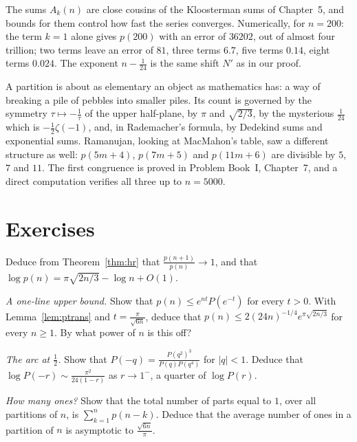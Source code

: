The sums $A_k(n)$ are close cousins of the Kloosterman sums of Chapter~5, and bounds for them control how fast the series converges. Numerically, for $n=200$: the term $k=1$ alone gives $p(200)$ with an error of $36202$, out of almost four trillion; two terms leave an error of $81$, three terms $6.7$, five terms $0.14$, eight terms $0.024$. The exponent $n-\frac1{24}$ is the same shift $N'$ as in our proof.

\begin{beauty}
A partition is about as elementary an object as mathematics has: a way of breaking a pile of pebbles into smaller piles. Its count is governed by the symmetry $\tau\mapsto-\frac1\tau$ of the upper half-plane, by $\pi$ and $\sqrt{2/3}$, by the mysterious $\frac1{24}$ which is $-\frac12\zeta(-1)$, and, in Rademacher's formula, by Dedekind sums and exponential sums. Ramanujan, looking at MacMahon's table, saw a different structure as well: $p(5m+4)$, $p(7m+5)$ and $p(11m+6)$ are divisible by $5$, $7$ and $11$. The first congruence is proved in Problem Book~I, Chapter~7, and a direct computation verifies all three up to $n=5000$.
\end{beauty}

\section{Exercises}

\begin{exercise}[$\star$]\label{ex:ratio}
Deduce from Theorem~\ref{thm:hr} that $\frac{p(n+1)}{p(n)}\to1$, and that $\log p(n)=\pi\sqrt{2n/3}-\log n+O(1)$.
\end{exercise}

\begin{exercise}[$\star$]\label{ex:saddle}
\emph{A one-line upper bound.} Show that $p(n)\le e^{nt}P(e^{-t})$ for every $t>0$. With Lemma~\ref{lem:ptrans} and $t=\frac\pi{\sqrt{6n}}$, deduce that $p(n)\le2(24n)^{-1/4}e^{\pi\sqrt{2n/3}}$ for every $n\ge1$. By what power of $n$ is this off?
\end{exercise}

\begin{exercise}[$\star\star$]\label{ex:minusone}
\emph{The arc at $\frac12$.} Show that $P(-q)=\frac{P(q^2)^3}{P(q)P(q^4)}$ for $|q|<1$. Deduce that $\log P(-r)\sim\frac{\pi^2}{24(1-r)}$ as $r\to1^-$, a quarter of $\log P(r)$.
\end{exercise}

\begin{exercise}[$\star\star$]\label{ex:ones}
\emph{How many ones?} Show that the total number of parts equal to $1$, over all partitions of $n$, is $\sum_{k=1}^np(n-k)$. Deduce that the average number of ones in a partition of $n$ is asymptotic to $\frac{\sqrt{6n}}\pi$.
\end{exercise}

